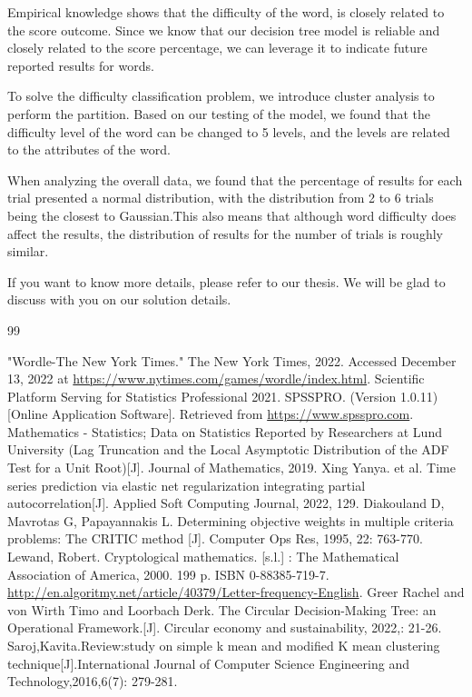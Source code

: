 \documentclass{mcmthesis}
\begin{document}
Empirical knowledge shows that the difficulty of the word, is closely related to the score outcome.  Since we know that our decision tree model is reliable and closely related to the score percentage, we can leverage it to indicate future reported results for words.

To solve the difficulty classification problem, we introduce cluster analysis to perform the partition. Based on our testing of the model, we found that the difficulty level of the word can be changed to 5 levels, and the levels are related to the attributes of the word.

When analyzing the overall data, we found that the percentage of results for each trial presented a normal distribution, with the distribution from 2 to 6 trials being the closest to Gaussian.This also means that although word difficulty does affect the results, the distribution of results for the number of trials is roughly similar.

If you want to know more details, please refer to our thesis. We will be glad to discuss with  you on our solution details.


\newpage
\begin{thebibliography}{99}

 "Wordle-The New York Times." The New York Times, 2022. Accessed December 13, 2022 at \url{https://www.nytimes.com/games/wordle/index.html}.
 Scientific Platform Serving for Statistics Professional 2021. SPSSPRO. (Version 1.0.11)[Online Application Software]. Retrieved from \url{https://www.spsspro.com}.
 Mathematics - Statistics; Data on Statistics Reported by Researchers at Lund University (Lag Truncation and the Local Asymptotic Distribution of the ADF Test for a Unit Root)[J]. Journal of Mathematics, 2019.
 Xing Yanya. et al. Time series prediction via elastic net regularization integrating partial autocorrelation[J]. Applied Soft Computing Journal, 2022, 129.
 Diakouland D, Mavrotas G, Papayannakis L. Determining objective weights in multiple criteria problems: The CRITIC method [J]. Computer Ops Res, 1995, 22: 763-770.
 Lewand, Robert. Cryptological mathematics. [s.l.] : The Mathematical Association of America, 2000. 199 p. ISBN 0-88385-719-7. \url{http://en.algoritmy.net/article/40379/Letter-frequency-English}.
 Greer Rachel and von Wirth Timo and Loorbach Derk. The Circular Decision-Making Tree: an Operational Framework.[J]. Circular economy and sustainability, 2022,: 21-26.
 Saroj,Kavita.Review:study on simple k mean and modified K mean clustering technique[J].International Journal of Computer Science Engineering and Technology,2016,6(7): 279-281.

\end{thebibliography}
\end{document}
